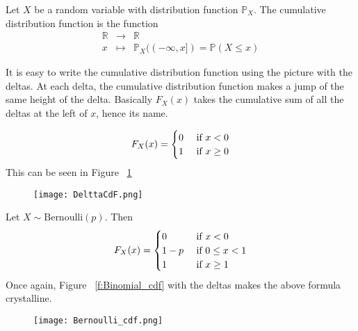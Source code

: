 \begin{definition}
Let $X$ be a random variable with distribution function $\mathbb P_X$. The cumulative distribution function is the function 
\begin{equation}
\begin{array}{ccc}
    \mathbb R & \to & \mathbb R \\
    x & \mapsto & \mathbb P_X((-\infty, x]) = \mathbb P(X \leq x )
\end{array}
\end{equation}
\end{definition}
It is easy to write the cumulative distribution function using the picture with the deltas. At each delta, the cumulative distribution function makes a jump of the same height of the delta. Basically $F_X(x)$ takes the cumulative sum of all the deltas at the left of $x$, hence its name. 
\begin{example}
\begin{equation}
F_X(x) = \begin{cases} 0 & \textrm{ if $ x < 0 $}\\
1 & \textrm{ if $ x \geq 0 $}
\end{cases}
\end{equation}
This can be seen in Figure ~\ref{f:cumulative_delta}

\begin{figure}[h!]
\texttt{[image: DelttaCdF.png]}
\label{f:cumulative_delta}
\end{figure}
\end{example}

\begin{example}
Let $X \sim \textrm{Bernoulli}(p)$. Then 
\begin{equation}
F_X(x) = \begin{cases}
    0 & \textrm{ if $ x < 0 $}\\
    1-p & \textrm{ if $ 0\leq x < 1 $}\\
    1 & \textrm{ if $ x \geq 1  $}    
\end{cases}
\end{equation}
Once again, Figure ~\ref{f:Binomial_cdf} with the deltas makes the above formula crystalline. 
\begin{figure}[h!]
\texttt{[image: Bernoulli\_cdf.png]}
\label{f:Bernoulli_cdf}
\end{figure}
\end{example}

